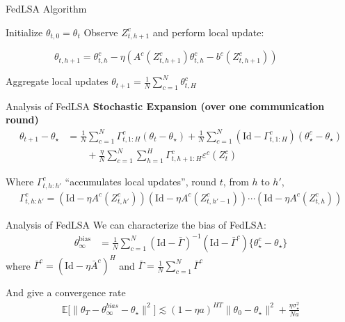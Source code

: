 \documentclass[aspectratio=169,14pt]{beamer}
\begin{document}
\begin{frame}{FedLSA Algorithm}
  \begin{algorithmic}
    \State Initialize $\theta_{t,0} = \theta_t$
    \State Observe $Z^c_{t,h+1}$ and perform local update:
    \begin{center}
      ~~~~~~~~~~$\theta_{t,h+1} = \theta_{t,h}^c - \eta( A^c(Z^c_{t,h+1}) \theta_{t,h}^c - b^c(Z^c_{t,h+1}))$
    \end{center}
    \EndFor
    \EndFor
    \State Aggregate local updates $\theta_{t+1} = \tfrac{1}{N} \sum\nolimits_{c=1}^{N} \theta_{t,H}^c $
    \EndFor
  \end{algorithmic}  
\end{frame}


\begin{frame}{Analysis of FedLSA}
  \textbf{Stochastic Expansion (over one communication round)}
  \begin{align*}
    \theta_{t+1} - \theta_\star
    & =
    \frac{1}{N} \sum_{c=1}^N \Gamma_{t,1:H}^c (\theta_{t} - \theta_\star)
    + \frac{1}{N} \sum_{c=1}^N (\text{Id} - \Gamma_{t,1:H}^c) (\theta_\star^c - \theta_\star)
    \\
    & \qquad + \frac{\eta}{N} \sum_{c=1}^N \sum_{h=1}^H \Gamma_{t,h+1:H}^c \varepsilon^c(Z_t^c)
  \end{align*}

  Where $\Gamma_{t,h:h'}^c$ ``accumulates local updates'', round $t$, from $h$ to $h'$,
  \begin{align*}
    \Gamma_{t,h:h'}^c = (\text{Id} - \eta A^c(Z^c_{t,h'})) (\text{Id} - \eta A^c(Z^c_{t,h'-1})) \cdots (\text{Id} - \eta A^c(Z^c_{t,h}))
  \end{align*}  
\end{frame}


\begin{frame}{Analysis of FedLSA}
  We can characterize the bias of FedLSA:
  \begin{align*}
    \theta_\infty^{\text{bias}}
    & =
      \frac{1}{N}
      \sum_{c=1}^N
      (\text{Id} - \bar{\Gamma})^{-1} 
      (\text{Id} - \bar{\Gamma}^c)\{ \theta_\star^c - \theta_\star \}
  \end{align*}
  where $\bar{\Gamma}^c = (\text{Id} - \eta \bar{A}^c)^H$ and $\bar{\Gamma} = \tfrac{1}{N} \sum_{c=1}^N \bar{\Gamma}^c$

  \pause

  \vspace{1em}
  
  And give a convergence rate
  \begin{align*}
    \mathbb{E} \Big[ \| {\theta_T - \theta^{bias}_{\infty} - \theta_\star} \|^2 \Big]
    \lesssim{}
    (1 - \eta a)^{H T} \| \theta_0 - \theta_\star \|^2
    + \frac{\eta \sigma_\star^2}{N a}
  \end{align*}
\end{frame}
\end{document}
